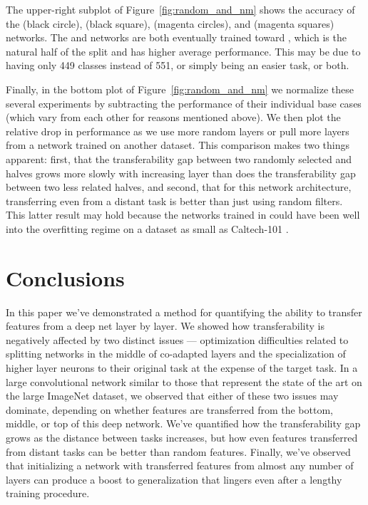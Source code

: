 The upper-right subplot of Figure~\ref{fig:random_and_nm} shows the accuracy of the  (black circle),  (black square),  (magenta circles), and  (magenta squares) networks. The  and  networks are both eventually trained toward \dA, which is the natural half of the split and has higher average performance. This may be due to having only 449 classes instead of 551, or simply being an easier task, or both.

Finally, in the bottom plot of Figure~\ref{fig:random_and_nm} we normalize these several experiments by subtracting the performance of their individual base cases (which vary from each other for reasons mentioned above). We then plot the relative drop in performance as we use more random layers or pull more layers from a network trained on another dataset. This comparison makes two things apparent: first, that the transferability gap between two randomly selected \dA and \dB halves grows more slowly with increasing layer than does the transferability gap between two less related halves, and second, that for this network architecture, transferring even from a distant task is better than just using random filters. This latter result may hold because the networks trained in \citep{Jarrett-ICCV2009} could have been well into the overfitting regime on a dataset as small as Caltech-101 \citep{Fei-Fei.2004}.



\section{Conclusions}

In this paper we've demonstrated a method for quantifying the ability to transfer features from a deep net layer by layer. We showed how transferability is negatively affected by two distinct issues --- optimization difficulties related to splitting networks in the middle of co-adapted layers and the specialization of higher layer neurons to their original task at the expense of the target task. In a large convolutional network similar to those that represent the state of the art on the large ImageNet dataset, we observed that either of these two issues may dominate, depending on whether features are transferred from the bottom, middle, or top of this deep network.
We've quantified how the transferability gap grows as the distance between tasks increases, but how even features transferred from distant tasks can be better than random features. Finally, we've observed that initializing a network with transferred features from almost any number of layers can produce a boost to generalization that lingers even after a lengthy training procedure.

